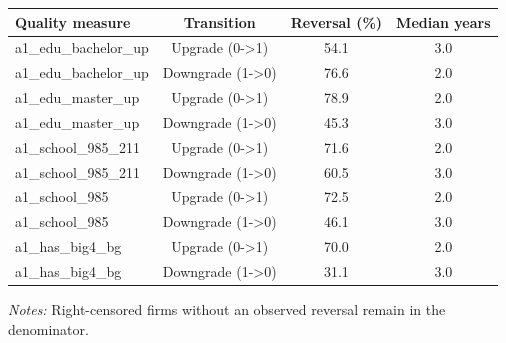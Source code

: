 \documentclass[10pt]{article}
\begin{document}
\begin{minipage}{19cm}\fontsize{10}{12}\selectfont\setlength{\tabcolsep}{4pt}\renewcommand{\arraystretch}{1.12}


\centering
{}
\begin{threeparttable}
\begin{tabular}{p{}ccc}
\toprule
Quality measure & Transition & Reversal (\%) & Median years \\
\midrule
a1\_edu\_bachelor\_up & Upgrade (0->1) & 54.1 & 3.0 \\
a1\_edu\_bachelor\_up & Downgrade (1->0) & 76.6 & 2.0 \\
a1\_edu\_master\_up & Upgrade (0->1) & 78.9 & 2.0 \\
a1\_edu\_master\_up & Downgrade (1->0) & 45.3 & 3.0 \\
a1\_school\_985\_211 & Upgrade (0->1) & 71.6 & 2.0 \\
a1\_school\_985\_211 & Downgrade (1->0) & 60.5 & 3.0 \\
a1\_school\_985 & Upgrade (0->1) & 72.5 & 2.0 \\
a1\_school\_985 & Downgrade (1->0) & 46.1 & 3.0 \\
a1\_has\_big4\_bg & Upgrade (0->1) & 70.0 & 2.0 \\
a1\_has\_big4\_bg & Downgrade (1->0) & 31.1 & 3.0 \\
\bottomrule
\end{tabular}
\begin{tablenotes}\fontsize{9}{11}\selectfont
\item \raggedright \fontsize{9}{11}\selectfont \textit{Notes:} Right-censored firms without an observed reversal remain in the denominator.
\end{tablenotes}
\end{threeparttable}

\end{minipage}
\end{document}
